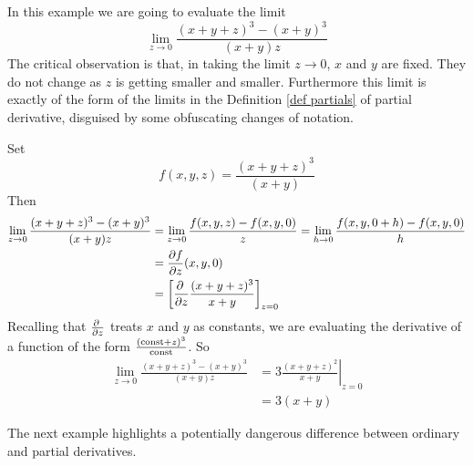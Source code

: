 \begin{eg}\label{eg partials F}
In this example we are going to evaluate the limit
\begin{equation*}
\lim_{z\rightarrow 0}\frac{(x+y+z)^3-(x+y)^3}{(x+y)z}
\end{equation*} 
The critical observation is that, in taking the limit $z\rightarrow 0$,
$x$ and $y$ are fixed. They do not change as $z$ is getting smaller and
smaller. Furthermore this limit is exactly of the form of the limits
in the Definition \ref{def partials} of partial derivative, disguised by some
obfuscating changes of notation. 

Set
\begin{equation*}
f(x,y,z) = \frac{(x+y+z)^3}{(x+y)}
\end{equation*}
Then
\begin{align*}
\lim_{z\rightarrow 0}\frac{(x+y+z)^3-(x+y)^3}{(x+y)z}
&=\lim_{z\rightarrow 0}\frac{f(x,y,z)-f(x,y,0)}{z}
=\lim_{h\rightarrow 0}\frac{f(x,y,0+h)-f(x,y,0)}{h} \\
&=\pdiff{f}{z}(x,y,0) \\
&={\left[\pdiff{}{z}\frac{(x+y+z)^3}{x+y}\right]}_{z=0} 
\end{align*}
Recalling that $\pdiff{}{z}$ treats $x$ and $y$ as constants, 
we are evaluating the derivative of a function of the form
$\frac{({\rm const}+z)^3}{\rm const}$. So
\begin{align*}
\lim_{z\rightarrow 0}\frac{(x+y+z)^3-(x+y)^3}{(x+y)z}
&={\left.3\frac{(x+y+z)^2}{x+y}\right|}_{z=0} \\
&=3(x+y)
\end{align*}

\end{eg}

The next example highlights a potentially dangerous difference between
ordinary and partial derivatives.

